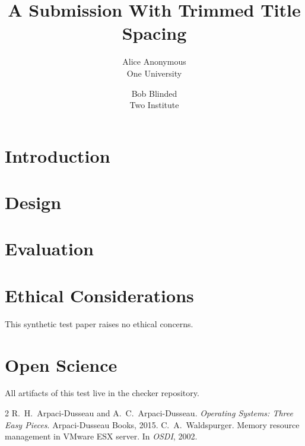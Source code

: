 \documentclass[letterpaper,twocolumn,10pt]{article}
\date{}
\title{\Large \bf A Submission With Trimmed Title Spacing\vspace{-20pt}}
\author{{\rm Alice Anonymous}\\One University \and {\rm Bob Blinded}\\Two Institute}
\begin{document}
\maketitle

\begin{abstract}
\lipsum[1][1-5]
\end{abstract}

\section{Introduction}
\lipsum[2-4]

\section{Design}
\lipsum[5-7]

\section{Evaluation}
\lipsum[8-9]

\appendix
\section*{Ethical Considerations}
This synthetic test paper raises no ethical concerns.

\section*{Open Science}
All artifacts of this test live in the checker repository.

\begin{thebibliography}{2}
 R.~H.\ Arpaci-Dusseau and A.~C.\ Arpaci-Dusseau.
  \emph{Operating Systems: Three Easy Pieces}. Arpaci-Dusseau Books, 2015.
 C.~A.\ Waldspurger. Memory resource management in VMware ESX
  server. In \emph{OSDI}, 2002.
\end{thebibliography}
\end{document}
